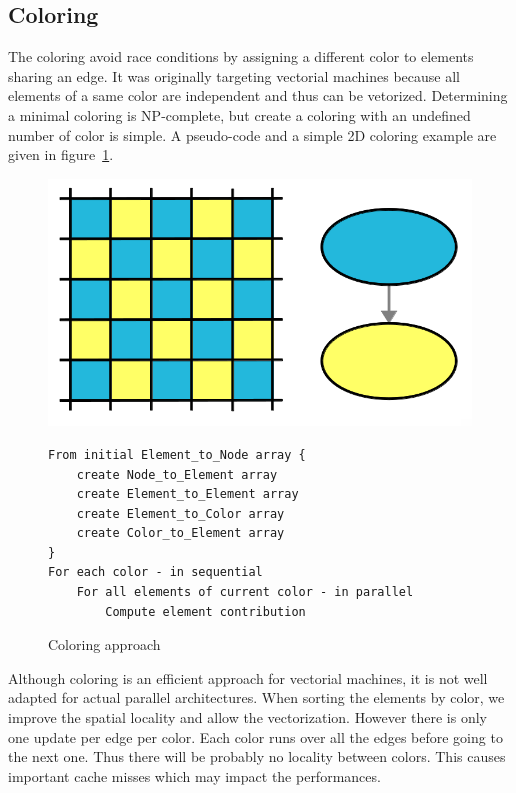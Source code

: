\documentclass{IOS-Book-Article}
\begin{document}
\subsection{Coloring}
\label{sec:col}
The coloring avoid race conditions by assigning a different color to elements sharing an edge.
It was originally targeting vectorial machines because all elements of a same color are independent and thus can be vetorized.
Determining a minimal coloring is NP-complete, but create a coloring with an undefined number of color is simple.
A pseudo-code and a simple 2D coloring example are given in figure~\ref{fig:colApp}.

\begin{figure}[htp]
 \includegraphics[scale=0.2]{Coloring_approach.png}
 \begin{verbatim}
From initial Element_to_Node array {
    create Node_to_Element array
    create Element_to_Element array
    create Element_to_Color array
    create Color_to_Element array
}
For each color - in sequential
    For all elements of current color - in parallel
        Compute element contribution
 \end{verbatim}
 \caption{Coloring approach}
 \label{fig:colApp}
\end{figure}

Although coloring is an efficient approach for vectorial machines, it is not well adapted for actual parallel architectures.
When sorting the elements by color, we improve the spatial locality and allow the vectorization. However there is only one update per edge per color.
Each color runs over all the edges before going to the next one. Thus there will be probably no locality between colors.
This causes important cache misses which may impact the performances.
\end{document}
